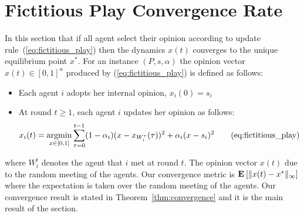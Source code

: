 \section{Fictitious Play Convergence Rate}\label{s:fictitious_convergence}
In this section that if all agent select their opinion according to
update rule~(\ref{eq:fictitious_play})
then the dynamics $x(t)$ converges to the unique equilibrium point $x^*$.
For an instance $(P,s,\alpha)$ the opinion vector $x(t) \in [0,1]^n$
produced by (\ref{eq:fictitious_play}) is defined as follows:
\begin{itemize}
 \item Each agent $i$ adopts her internal opinion, $x_i(0)=s_i$
 \item At round $t \geq 1$, each agent $i$ updates her opinion as follows:
 \begin{equation}
  x_i(t) =
  \operatorname*{argmin}_{x \in [0,1]}\sum_{\tau=0}^{t-1}
  (1-\alpha_i)(x-x_{W_i^\tau}(\tau))^2+\alpha_i(x-s_i)^2 \tag{eq:fictitious\_play}
\end{equation}
\end{itemize}
where $W_i^t$ denotes the agent that $i$ met at round $t$. The opinion vector $x(t)$
due to the random meeting of the agents. Our convergence metric
is $\bm{\mathrm{E}}_{} \left[ \| x(t) - x^* \|_{\infty} \right]$
where the expectation is taken over the random meeting of the agents.
Our convergence result is stated in Theorem~\ref{thm:convergence}
and it is the main result of the section.

